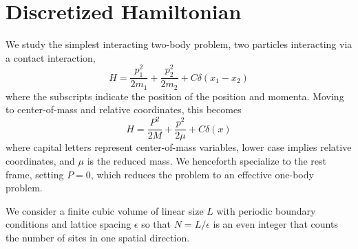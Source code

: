 \section{Discretized Hamiltonian}\label{sec:hamiltonian}

We study the simplest interacting two-body problem, two particles interacting via a contact interaction,
\begin{equation}
    H = \frac{p_1^2}{2 m_1} + \frac{p_2^2}{2 m_2} + C \delta(x_1-x_2)
\end{equation}
where the subscripts indicate the position of the position and momenta.  Moving to center-of-mass and relative coordinates, this becomes
\begin{equation}
    \label{eq:hamiltonian}
    H = \frac{P^2}{2 M} + \frac{p^2}{2 \mu} + C \delta(x)
\end{equation}
where capital letters represent center-of-mass variables, lower case implies relative coordinates, and $\mu$ is the reduced mass.  We henceforth specialize to the rest frame, setting $P=0$, which reduces the problem to an effective one-body problem.

We consider a finite cubic volume of linear size $L$ with periodic boundary conditions and lattice spacing $\epsilon$ so that $N=L/\epsilon$ is an even integer that counts the number of sites in one spatial direction.

